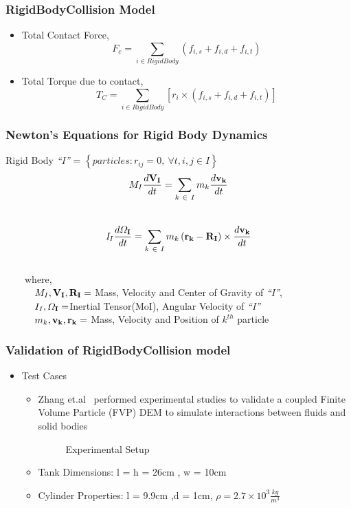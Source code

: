 \documentclass{beamer}
\begin{document}
%
 \begin{frame} %
  \frametitle{RigidBodyCollision Model}
  \begin{itemize}
   \item Total Contact Force, $$F_c = \sum_{i\in RigidBody} \left(f_{i,s} + f_{i,d} + f_{i,t} \right)$$
   \item Total Torque due to contact, $$T_C = \sum_{i\in RigidBody} \left[ r_{i} \times \left(f_{i,s} + f_{i,d} + f_{i,t} \right)\right] $$
  \end{itemize}
 \end{frame}
 
  \begin{frame} %
  \frametitle{Newton's Equations for Rigid Body Dynamics}
    Rigid Body {\it{``I''}} = $\left\lbrace particles : r_{ij} = 0, ~ \forall t , i,j \in I\right\rbrace$ \pause \\
     $$ M_{I}\frac{d{\it{{\bf{V_I}}}}}{dt} = \sum_{k~\in~I} m_{k} \frac{d{\it{{\bf{v_k}}}}}{dt}$$ \\
    $${\bf{\it{I_I}}} \frac{d{\bf{\varOmega _{I}}}}{dt} = \sum_{k~\in~I} m_{k}\left( {\bf{r_k - R_I}}\right) \times \frac{d{\it{{\bf{v_k}}}}}{dt}$$ \\
    ~~~~where, \\
    ~~~~~~$M_I , {\it{\bf{V_I}}}, {\it{\bf{R_I}}} = $ Mass, Velocity and Center of Gravity of {\it{``I''}}, \\
    ~~~~~~$I_I , {{\bf{\varOmega _{I}}}} = $Inertial Tensor(MoI), Angular Velocity of {\it{``I''}} \\
    ~~~~~~$m_k , {\it{{\bf{v_k}}}}, \bf{r_k} =$ Mass, Velocity and Position of $k^{th}$ particle\\
 \end{frame}

  \begin{frame} %
  \frametitle{Validation of RigidBodyCollision model}
  	\begin{itemize}
  	 \item Test Cases
  	  \begin{itemize}
 	   \item Zhang et.al\footnotemark ~ performed experimental studies to validate a coupled Finite Volume Particle (FVP) DEM to simulate interactions between fluids and solid bodies 
 	   \begin{figure}
 	   \centering{}
 	   \caption{Experimental Setup}
 	   \end{figure}
 	   \item Tank Dimensions: l = h = 26cm , w = 10cm
 	   \item Cylinder Properties: l = 9.9cm ,d = 1cm, $\rho =2.7 \times 10^{3} \frac{kg}{m^3} $
      \end{itemize}
    \end{itemize}
    
  \end{frame}
  
\end{document}
